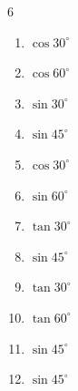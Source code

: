 \begin{multicols}{6}
\begin{enumerate}
        \phantom{$\displaystyle =1$}

  \item $\displaystyle \cos{30^\circ}$


  \item $\displaystyle \cos{60^\circ}$


  \item $\displaystyle \sin{30^\circ}$


  \item $\displaystyle \sin{45^\circ}$


  \item $\displaystyle \cos{30^\circ}$


  \item $\displaystyle \sin{60^\circ}$


  \item $\displaystyle \tan{30^\circ}$


  \item $\displaystyle \sin{45^\circ}$


  \item $\displaystyle \tan{30^\circ}$


  \item $\displaystyle \tan{60^\circ}$


  \item $\displaystyle \sin{45^\circ}$


  \item $\displaystyle \sin{45^\circ}$



\end{enumerate}
\end{multicols}
